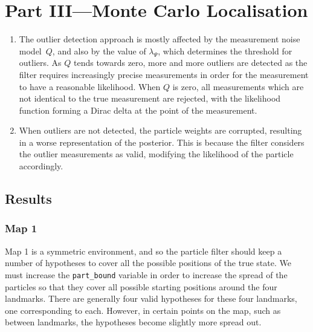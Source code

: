 \documentclass[a4paper,12pt]{article}
\begin{document}
\section{Part III---Monte Carlo Localisation}
\begin{enumerate}[resume]
\item The outlier detection approach is mostly affected by the measurement noise
  model~$Q$, and also by the value of $\lambda_\Psi$, which determines the
  threshold for outliers. As $Q$ tends towards zero, more and more outliers are
  detected as the filter requires increasingly precise measurements in order for
  the measurement to have a reasonable likelihood. When $Q$ is zero, all
  measurements which are not identical to the true measurement are rejected,
  with the likelihood function forming a Dirac delta at the point of the measurement.
\item When outliers are not detected, the particle weights are corrupted,
  resulting in a worse representation of the posterior. This is because the
  filter considers the outlier measurements as valid, modifying the likelihood
  of the particle accordingly.
\end{enumerate}
\subsection{Results}
\subsubsection{Map 1}
Map 1 is a symmetric environment, and so the particle filter should keep a
number of hypotheses to cover all the possible positions of the true state. We
must increase the \texttt{part\_bound} variable in order to increase the spread
of the particles so that they cover all possible starting positions around the
four landmarks. There are generally four valid hypotheses for these four
landmarks, one corresponding to each. However, in certain points on the map,
such as between landmarks, the hypotheses become slightly more spread out.
\end{document}
